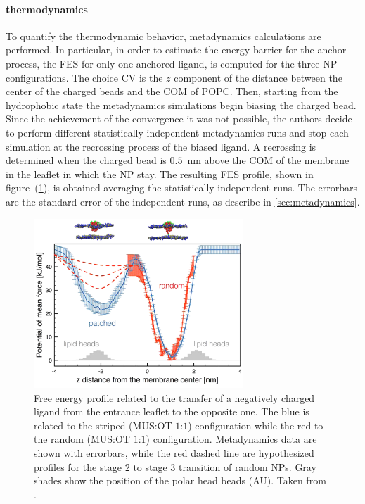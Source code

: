 \paragraph{\textbf{thermodynamics}} To quantify the thermodynamic behavior, metadynamics calculations are performed. In particular, in order to estimate the energy barrier for the anchor process, the \ac{FES} for only one anchored ligand, is computed for the three \ac{NP} configurations. The choice \ac{CV} is the $z$ component of the distance between the center of the charged beads and the \ac{COM} of \ac{POPC}. Then, starting from the hydrophobic state the metadynamics simulations begin biasing the charged bead. Since the achievement of the convergence it was not possible, the authors decide to perform different statistically independent metadynamics runs and stop each simulation at the recrossing process of the biased ligand. A recrossing is determined when the charged bead is $0.5$~nm above the \ac{COM} of the membrane in the leaflet in which the \ac{NP} stay. The resulting \ac{FES} profile, shown in figure~(\ref{fig:NPFES}), is obtained averaging the statistically independent runs. The errorbars are the standard error of the independent runs, as describe in \ref{sec:metadynamics}.
\begin{figure}[h!t]
	\centering
	\includegraphics[width=0.7\textwidth]{./img/NPFES}
	\caption{Free energy profile related to the transfer of a negatively charged ligand from the entrance leaflet to the opposite one. The blue is related to the striped (\ac{MUS}:\ac{OT} $1$:$1$) configuration while the red to the random (\ac{MUS}:\ac{OT} $1$:$1$) configuration. Metadynamics data are shown with errorbars, while the red dashed line are hypothesized profiles for the stage $2$ to stage $3$ transition of random \acp{NP}. Gray shades show the position of the polar head beads (AU). Taken from \cite{ourPaper}.}
	\label{fig:NPFES}
\end{figure}
